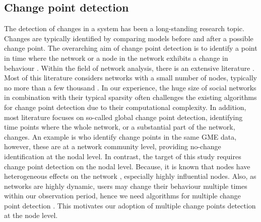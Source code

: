 
\subsection{Change point detection}
The detection of changes in a system has been a long-standing research topic. Changes are typically identified by comparing models before and after a possible change point. The overarching aim of change point detection is to identify a point in time where the network or a node in the network exhibits a change in behaviour \citet{ghezzi2024fast}. Within the field of network analysis, there is an extensive literature \citep{kendrick2018change, woodall2017overview}.  
Most of this literature considers networks with a small number of nodes, typically no more than a few thousand \citep{chen2024monitoring,Yu2022monitoring}. In our experience, the huge size of social networks in combination with their typical sparsity often challenges the existing algorithms for change point detection due to their computational complexity. In addition, most literature focuses on so-called global change point detection, identifying time points where the whole network, or a substantial part of the network, changes. An example is \citet{zwetsloot2025online} who identify change points in the same GME data, however, these are at a network community level, providing no-change identification at the nodal level. In contrast, the target of this study requires change point detection on the nodal level. Because, it is known that nodes have heterogeneous effects on the network \citet{chen2023community}, especially highly influential nodes. Also, as networks are highly dynamic, users may change their behaviour multiple times within our observation period, hence we need algorithms for multiple change point detection \citep{niu2016multiple,bai2023multiple}. This motivates our adoption of multiple change points detection at the node level.


